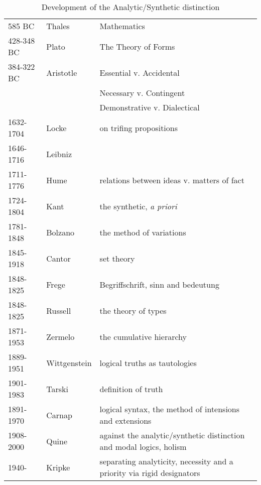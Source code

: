 \begin{table}[h]
\begin{center}
\begin{tabular}{|l l p{4.5cm}|}
\hline
585 BC & Thales & Mathematics\\
428-348 BC & Plato & The Theory of Forms\\
384-322 BC & Aristotle & Essential v. Accidental \\
& & Necessary v. Contingent\\
& & Demonstrative v. Dialectical\\
1632-1704 & Locke & on trifing propositions\\
1646-1716 & Leibniz & \\
1711-1776 & Hume & relations between ideas v. matters of fact \\
1724-1804 & Kant & the synthetic, \emph{a priori} \\
1781-1848 & Bolzano & the method of variations \\
1845-1918 & Cantor & set theory \\
1848-1825 & Frege & Begriffschrift, sinn and bedeutung \\
1848-1825 & Russell & the theory of types \\
1871-1953 & Zermelo & the cumulative hierarchy \\
1889-1951 & Wittgenstein & logical truths as tautologies \\
1901-1983 & Tarski & definition of truth \\
1891-1970 & Carnap & logical syntax, the method of intensions and extensions\\
1908-2000 & Quine & against the analytic/synthetic distinction and modal logics, holism\\
1940- & Kripke & separating analyticity, necessity and a priority via rigid designators\\
\hline
\end{tabular}
\caption{Development of the Analytic/Synthetic distinction}
\label{tab:AnalyticSynthetic}
\end{center}
\end{table}

